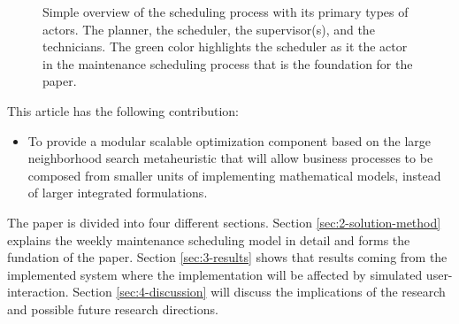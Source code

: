 \begin{figure}
	
	\caption{Simple overview of the scheduling process with its primary types of actors. The planner, the scheduler, the supervisor(s), and the technicians. 
	The green color highlights the scheduler as it the actor in the maintenance scheduling process that is the foundation for the paper.}
\end{figure}


This article has the following contribution:
\begin{itemize}
	\item To provide a modular scalable optimization component based on the large neighborhood search metaheuristic that will allow business processes to be composed from smaller units of implementing mathematical models, instead of larger integrated formulations.
\end{itemize}

The paper is divided into four different sections. Section \ref{sec:2-solution-method} explains the weekly maintenance scheduling model in detail and forms the fundation of the paper. Section \ref{sec:3-results} shows that results coming from the implemented system where the implementation will be affected by simulated user-interaction. Section \ref{sec:4-discussion} will discuss the implications of the research and possible future research directions.

